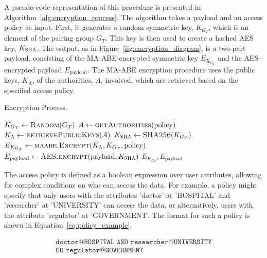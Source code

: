 \documentclass[cic,tc,english]{iiufrgs}
\numberwithin{algorithm}{chapter}
\begin{document}
        A pseudo-code representation of this procedure is presented in Algorithm~\ref{alg:encryption_process}. The algorithm takes a payload and an access policy as input. First, it generates a random symmetric key, $K_{G_T}$, which is an element of the pairing group $G_T$. This key is then used to create a hashed AES key, $K_{\textsc{SHA}}$. The output, as in Figure~\ref{fig:encryption_diagram}, is a two-part payload, consisting of the MA-ABE-encrypted symmetric key $E_{K_{G_T}}$ and the AES-encrypted payload $E_{\text{payload}}$. The MA-ABE encryption procedure uses the public keys, $K_A$, of the authorities, $A$, involved, which are retrieved based on the specified access policy. 

        \begin{algorithm}[h]
            \caption{Encryption Process.}
            \label{alg:encryption_process}
            \begin{algorithmic}[1]
                \State $K_{G_T} \gets \textsc{Random}(G_T)$
                \State $A \gets \textsc{getAuthorities}(\text{policy})$
                \State $K_{\textsc{A}} \gets \textsc{retrievePublicKeys}(A)$
                \State $K_{\textsc{SHA}} \gets \textsc{SHA256}(K_{G_T})$
                \State $E_{K_{G_T}} \gets \textsc{maabe.Encrypt}(K_{\textsc{A}}, K_{G_T}, \text{policy})$
                \State $E_{\text{payload}} \gets \textsc{AES.encrypt}(\text{payload}, K_{\textsc{SHA}})$
                \State \Return $E_{K_{G_T}}, E_{\text{payload}}$
            \EndProcedure
            \end{algorithmic}
        \end{algorithm}

        The access policy is defined as a boolean expression over user attributes, allowing for complex conditions on who can access the data. For example, a policy might specify that only users with the attributes 'doctor' at 'HOSPITAL' and 'researcher' at 'UNIVERSITY' can access the data, or alternatively, users with the attribute 'regulator' at 'GOVERNMENT'. The format for such a policy is shown in Equation~\ref{eq:policy_example}.

        \begin{multline}
            \label{eq:policy_example}
            \texttt{doctor@HOSPITAL AND researcher@UNIVERSITY}\\
            \texttt{OR regulator@GOVERNMENT}
        \end{multline}
\end{document}
